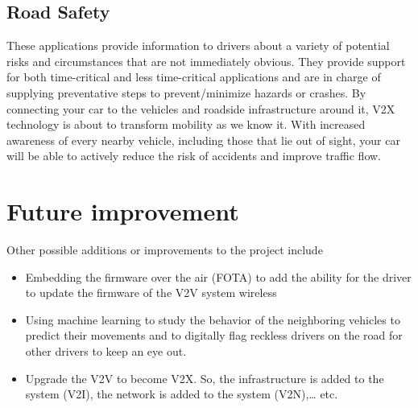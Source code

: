 \subsection{Road Safety}
These applications provide information to drivers about a variety of potential risks and
circumstances that are not immediately obvious. They provide support for both time-critical and
less time-critical applications and are in charge of supplying preventative steps to
prevent/minimize hazards or crashes. By connecting your car to the vehicles and roadside
infrastructure around it, V2X technology is about to transform mobility as we know it. With
increased awareness of every nearby vehicle, including those that lie out of sight, your car will
be able to actively reduce the risk of accidents and improve traffic flow.

\section{Future improvement}

Other possible additions or improvements to the project include

\begin{itemize}
    \item Embedding the firmware over the air (FOTA) to add the ability for the driver to update the firmware of the V2V system wireless
    \item Using machine learning to study the behavior of the neighboring vehicles to predict their movements and to digitally flag reckless drivers on the road for other drivers to keep an eye out.
    \item Upgrade the V2V to become V2X. So, the infrastructure is added to the system (V2I), the network is added to the system (V2N),… etc.
\end{itemize}